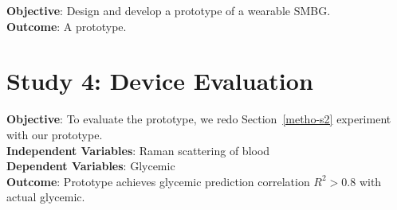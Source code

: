 \textbf{Objective}: Design and develop a prototype of a wearable SMBG.\\
\textbf{Outcome}: A prototype.

\section{Study 4: Device Evaluation}

\textbf{Objective}: To evaluate the prototype, we redo Section~\ref{metho-s2} experiment with our prototype.\\
\textbf{Independent Variables}: Raman scattering of blood\\
\textbf{Dependent Variables}: Glycemic\\
\textbf{Outcome}: Prototype achieves glycemic prediction correlation $R^2 > 0.8$ with actual glycemic.